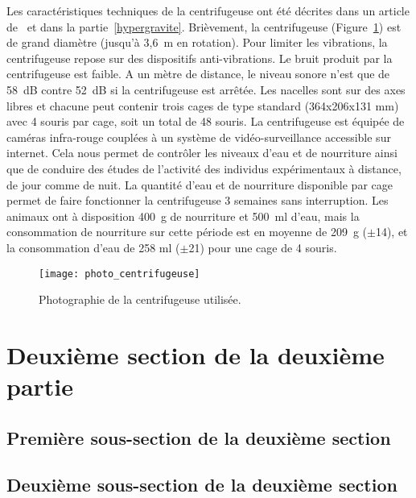 		Les caractéristiques techniques de la centrifugeuse ont été décrites dans un article de~\cite{jamon_ground-based_2008} et dans la partie~\ref{hypergravite}. Brièvement, la centrifugeuse (Figure~\ref{photo_centrifugeuse}) est de grand diamètre (jusqu'à 3,6~m en rotation). Pour limiter les vibrations, la centrifugeuse repose sur des dispositifs anti-vibrations. Le bruit produit par la centrifugeuse est faible. A un mètre de distance, le niveau sonore n'est que de 58~dB contre 52~dB si la centrifugeuse est arrêtée. Les nacelles sont sur des axes libres et chacune peut contenir trois cages de type standard (364x206x131 mm) avec 4 souris par cage, soit un total de 48 souris. La centrifugeuse est équipée de caméras infra-rouge couplées à un système de vidéo-surveillance accessible sur internet. Cela nous permet de contrôler les niveaux d'eau et de nourriture ainsi que de conduire des études de l'activité des individus expérimentaux à distance, de jour comme de nuit. La quantité d'eau et de nourriture disponible par cage permet de faire fonctionner la centrifugeuse 3 semaines sans interruption. Les animaux ont à disposition 400~g de nourriture et 500~ml d'eau, mais la consommation de nourriture sur cette période est en moyenne de 209~g ($\pm$14), et la consommation d'eau de 258 ml ($\pm$21) pour une cage de 4 souris.
		
		\begin{figure}[h!tbp]
			\vspace{0.5cm}
			\setcapindent{2em}
			\centering
			\texttt{[image: photo\_centrifugeuse]}
			\caption[Photographie de la centrifugeuse]{Photographie de la centrifugeuse utilisée.}
			\label{photo_centrifugeuse}
		\end{figure}

		\lipsum[2]

\section{Deuxième section de la deuxième partie}

	\lipsum[3]

		\subsection{Première sous-section de la deuxième section}

		\lipsum[4]

		\subsection[Sous-sous section 2]{Deuxième sous-section de la deuxième section} %

